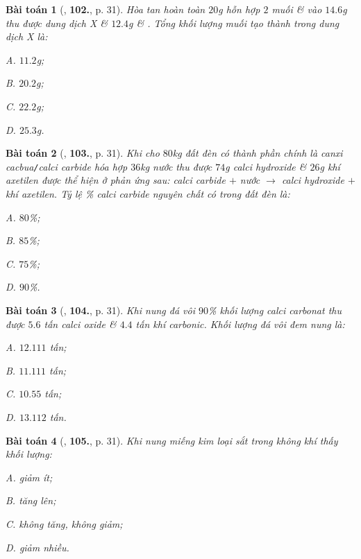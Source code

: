 \documentclass{article}
\numberwithin{equation}{section}
\newtheorem{baitoan}{Bài toán}[section]
\begin{document}
\begin{baitoan}[\cite{An2011}, \textbf{102.}, p. 31]
	Hòa tan hoàn toàn $20$g hỗn hợp $2$ muối  \&  vào $14.6$g  thu được dung dịch X \& $12.4$g  \& . Tổng khối lượng muối tạo thành trong dung dịch X là:
	\begin{enumerate*}
		\item[{\rm\sf A.}] $11.2$g;
		\item[{\rm\sf B.}] $20.2$g;
		\item[{\rm\sf C.}] $22.2$g;
		\item[{\rm\sf D.}] $25.3$g.
	\end{enumerate*}
\end{baitoan}

\begin{baitoan}[\cite{An2011}, \textbf{103.}, p. 31]
	Khi cho $80$kg đất đèn có thành phần chính là canxi cacbua\emph{\texttt{/}}calci carbide hóa hợp $36$kg nước thu được $74$g calci hydroxide \& $26$g khí axetilen được  thể hiện ở phản ứng sau: calci carbide $+$ nước $\to$ calci hydroxide $+$ khí axetilen. Tỷ lệ \% calci carbide nguyên chất có trong đất đèn là:
	\begin{enumerate*}
		\item[{\rm\sf A.}] $80$\%;
		\item[{\rm\sf B.}] $85$\%;
		\item[{\rm\sf C.}] $75$\%;
		\item[{\rm\sf D.}] $90$\%.
	\end{enumerate*}
\end{baitoan}

\begin{baitoan}[\cite{An2011}, \textbf{104.}, p. 31]
	Khi nung đá vôi $90$\% khối lượng calci carbonat  thu được $5.6$ tấn calci oxide  \& $4.4$ tấn khí carbonic. Khối lượng đá vôi đem nung là:
	\begin{enumerate*}
		\item[{\rm\sf A.}] $12.111$ tấn;
		\item[{\rm\sf B.}] $11.111$ tấn;
		\item[{\rm\sf C.}] $10.55$ tấn;
		\item[{\rm\sf D.}] $13.112$ tấn.
	\end{enumerate*}
\end{baitoan}

\begin{baitoan}[\cite{An2011}, \textbf{105.}, p. 31]
	Khi nung miếng kim loại sắt trong không khí thấy khối lượng:
	\begin{enumerate*}
		\item[{\rm\sf A.}] giảm ít;
		\item[{\rm\sf B.}] tăng lên;
		\item[{\rm\sf C.}] không tăng, không giảm;
		\item[{\rm\sf D.}] giảm nhiều.
	\end{enumerate*}
\end{baitoan}
\end{document}

